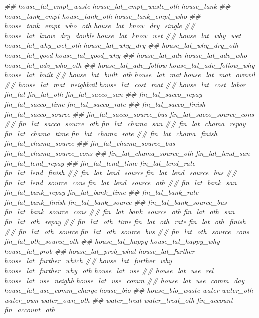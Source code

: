 \documentclass[
]{article}
\newenvironment{Shaded}{\begin{snugshade}}{\end{snugshade}}
\newcommand{\CommentTok}[1]{\textcolor[rgb]{0.56,0.35,0.01}{\textit{#1}}}
\begin{document}
\begin{Shaded}
\begin{Highlighting}[]
\CommentTok{##      house_lat_empt_waste house_lat_empt_waste_oth house_tank}
\CommentTok{##      house_tank_empt house_tank_oth house_tank_empt_who}
\CommentTok{##      house_tank_empt_who_oth house_lat_know_dry_single}
\CommentTok{##      house_lat_know_dry_double house_lat_know_wet}
\CommentTok{##      house_lat_why_wet house_lat_why_wet_oth house_lat_why_dry}
\CommentTok{##      house_lat_why_dry_oth house_lat_good house_lat_good_why}
\CommentTok{##      house_lat_adv house_lat_adv_who house_lat_adv_who_oth}
\CommentTok{##      house_lat_adv_follow house_lat_adv_follow_why house_lat_built}
\CommentTok{##      house_lat_built_oth house_lat_mat house_lat_mat_ownvil}
\CommentTok{##      house_lat_mat_neighbvil house_lat_cost_mat}
\CommentTok{##      house_lat_cost_labor fin_lat fin_lat_oth fin_lat_sacco_san}
\CommentTok{##      fin_lat_sacco_repay fin_lat_sacco_time fin_lat_sacco_rate}
\CommentTok{##      fin_lat_sacco_finish fin_lat_sacco_source}
\CommentTok{##      fin_lat_sacco_source_bus fin_lat_sacco_source_cons}
\CommentTok{##      fin_lat_sacco_source_oth fin_lat_chama_san}
\CommentTok{##      fin_lat_chama_repay fin_lat_chama_time fin_lat_chama_rate}
\CommentTok{##      fin_lat_chama_finish fin_lat_chama_source}
\CommentTok{##      fin_lat_chama_source_bus fin_lat_chama_source_cons}
\CommentTok{##      fin_lat_chama_source_oth fin_lat_lend_san fin_lat_lend_repay}
\CommentTok{##      fin_lat_lend_time fin_lat_lend_rate fin_lat_lend_finish}
\CommentTok{##      fin_lat_lend_source fin_lat_lend_source_bus}
\CommentTok{##      fin_lat_lend_source_cons fin_lat_lend_source_oth}
\CommentTok{##      fin_lat_bank_san fin_lat_bank_repay fin_lat_bank_time}
\CommentTok{##      fin_lat_bank_rate fin_lat_bank_finish fin_lat_bank_source}
\CommentTok{##      fin_lat_bank_source_bus fin_lat_bank_source_cons}
\CommentTok{##      fin_lat_bank_source_oth fin_lat_oth_san fin_lat_oth_repay}
\CommentTok{##      fin_lat_oth_time fin_lat_oth_rate fin_lat_oth_finish}
\CommentTok{##      fin_lat_oth_source fin_lat_oth_source_bus}
\CommentTok{##      fin_lat_oth_source_cons fin_lat_oth_source_oth}
\CommentTok{##      house_lat_happy house_lat_happy_why house_lat_prob}
\CommentTok{##      house_lat_prob_what house_lat_further house_lat_further_which}
\CommentTok{##      house_lat_further_why house_lat_further_why_oth house_lat_use}
\CommentTok{##      house_lat_use_rel house_lat_use_neighb house_lat_use_comm}
\CommentTok{##      house_lat_use_comm_day house_lat_use_comm_charge house_bio}
\CommentTok{##      house_bio_waste water water_oth water_own water_own_oth}
\CommentTok{##      water_treat water_treat_oth fin_account fin_account_oth}

\end{Highlighting}
\end{Shaded}
\end{document}
